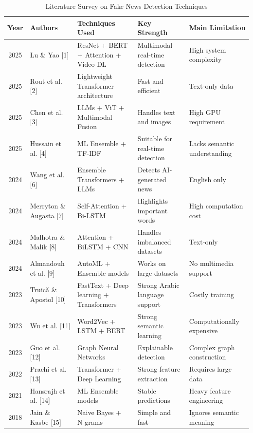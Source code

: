\documentclass[conference]{IEEEtran}
\begin{document}
\begin{table}[t]
\centering
\caption{Literature Survey on Fake News Detection Techniques}
\label{tab:lit_survey}

\renewcommand{\arraystretch}{1.25}

\begin{tabular}{|c|l|p{4cm}|p{3cm}|p{4cm}|}
\hline
\textbf{Year} & \textbf{Authors} & \textbf{Techniques Used} & \textbf{Key Strength} & \textbf{Main Limitation} \\
\hline

2025 & Lu \& Yao [1] & ResNet + BERT + Attention + Video DL & Multimodal real-time detection & High system complexity \\
\hline
2025 & Rout et al. [2] & Lightweight Transformer architecture & Fast and efficient & Text-only data \\
\hline
2025 & Chen et al. [3] & LLMs + ViT + Multimodal Fusion & Handles text and images & High GPU requirement \\
\hline
2025 & Hussain et al. [4] & ML Ensemble + TF-IDF & Suitable for real-time detection & Lacks semantic understanding \\
\hline
2024 & Wang et al. [6] & Ensemble Transformers + LLMs & Detects AI-generated news & English only \\
\hline
2024 & Merryton \& Augasta [7] & Self-Attention + Bi-LSTM & Highlights important words & High computation cost \\
\hline
2024 & Malhotra \& Malik [8] & Attention + BiLSTM + CNN & Handles imbalanced datasets & Text-only \\
\hline
2024 & Almandouh et al. [9] & AutoML + Ensemble models & Works on large datasets & No multimedia support \\
\hline
2023 & Truică \& Apostol [10] & FastText + Deep learning + Transformers & Strong Arabic language support & Costly training \\
\hline
2023 & Wu et al. [11] & Word2Vec + LSTM + BERT & Strong semantic learning & Computationally expensive \\
\hline
2023 & Guo et al. [12] & Graph Neural Networks & Explainable detection & Complex graph construction \\
\hline
2022 & Prachi et al. [13] & Transformer + Deep Learning & Strong feature extraction & Requires large data \\
\hline
2021 & Hansrajh et al. [14] & ML Ensemble models & Stable predictions & Heavy feature engineering \\
\hline
2018 & Jain \& Kasbe [15] & Naive Bayes + N-grams & Simple and fast & Ignores semantic meaning \\
\hline

\end{tabular}
\end{table}
\end{document}
